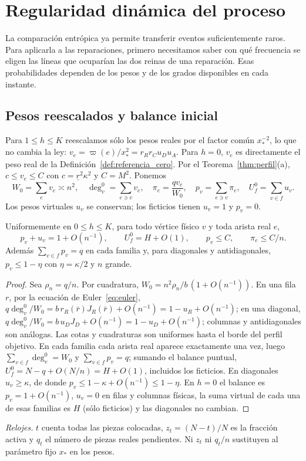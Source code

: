 \section{Regularidad dinámica del proceso}\label{sec:regularidad}

La comparación entrópica ya permite transferir eventos suficientemente raros.
Para aplicarla a las reparaciones, primero necesitamos saber con qué frecuencia
se eligen las líneas que ocuparían las dos reinas de una reparación. Esas
probabilidades dependen de los pesos y de los grados disponibles en cada instante.

\subsection{Pesos reescalados y balance inicial}

Para $1\le h\le K$ reescalamos sólo los pesos reales por el factor común $x_*^{-2}$, lo que no
cambia la ley: $v_e=\varpi(e)/x_*^2=r_Rr_Cu_Du_A$. Para $h=0$, $v_e$ es directamente el peso real
de la Definición~\ref{def:referencia_cero}. Por el Teorema~\ref{thm:perfil}(a), $c\le v_e\le C$ con
$c=\underline r^2\kappa^2$ y $C=M^2$. Ponemos
\[
 W_0=\sum_ev_e\asymp n^2,\quad \deg_v^0=\sum_{e\ni v}v_e,\quad \pi_e=\frac{qv_e}{W_0},\quad
 p_v=\sum_{e\ni v}\pi_e,\quad U_f^0=\sum_{v\in f}u_v .
\]
Los pesos virtuales $u_v$ se conservan; los ficticios tienen $u_v=1$ y $p_v=0$.

\begin{lema}\label{lem:balance}
Uniformemente en $0\le h\le K$, para todo vértice físico $v$ y toda arista real $e$,
\begin{equation}\label{eq:balance}
 p_v+u_v=1+O(n^{-1}),\qquad U_f^0=H+O(1),\qquad p_v\le C,\qquad \pi_e\le C/n .
\end{equation}
Además $\sum_{v\in f}p_v=q$ en cada familia y, para diagonales y antidiagonales,
$p_v\le1-\eta$ con $\eta=\kappa/2$ y $n$ grande.
\end{lema}

\begin{proof}
Sea $\rho_n=q/n$. Por cuadratura, $W_0=n^2\rho_n/b\,(1+O(n^{-1}))$. En una fila $r$, por la
ecuación de Euler~\eqref{eq:euler},
$q\deg_v^0/W_0=b\,r_R(\bar r)J_R(\bar r)+O(n^{-1})=1-u_R+O(n^{-1})$; en una diagonal,
$q\deg_v^0/W_0=b\,u_DJ_D+O(n^{-1})=1-u_D+O(n^{-1})$; columnas y antidiagonales son análogas.
Las cotas y cuadraturas son uniformes hasta el borde del perfil objetivo. En cada familia cada
arista real aparece exactamente una vez, luego $\sum_{v\in f}\deg_v^0=W_0$ y
$\sum_{v\in f}p_v=q$; sumando el balance puntual, $U_f^0=N-q+O(N/n)=H+O(1)$, incluidos los
ficticios. En diagonales $u_v\ge\kappa$, de donde $p_v\le1-\kappa+O(n^{-1})\le1-\eta$. En $h=0$
el balance es $p_v=1+O(n^{-1})$, $u_v=0$ en filas y columnas físicas, la suma virtual de cada una
de esas familias es $H$ (sólo ficticios) y las diagonales no cambian.
\end{proof}

\emph{Relojes.} $t$ cuenta todas las piezas colocadas, $z_t=(N-t)/N$ es la fracción activa y
$q_t$ el número de piezas reales pendientes. Ni $z_t$ ni $q_t/n$ sustituyen al parámetro fijo
$x_*$ en los pesos.
